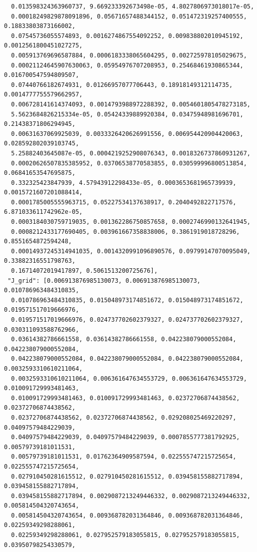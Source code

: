 \documentclass[11pt,reqno]{amsart}
\numberwithin{equation}{section}
\theoremstyle{definition}
\theoremstyle{remark}
\begin{document}
\begin{lstlisting}
  0.013598324363960737, 9.669233392673498e-05, 4.8027806973018017e-05,
  0.00018249829878091896, 0.05671657488344152, 0.051472319257400555, 0.18833803873166002,
  0.07545736055574893, 0.0016274867554092252, 0.009838802010945192, 0.0012561800451027275,
  0.005913769696587884, 0.0006183338065604295, 0.002725978105029675,
  0.00021124645907630063, 0.05954976707208953, 0.25468461930865344, 0.016700547594809507,
  0.07440766182674931, 0.01266957077706443, 0.18918149312114735, 0.0014777755579662957,
  0.006728141614374093, 0.0014793988972288392, 0.0054601805478273185,
  5.5623684826215334e-05, 0.05424339889920384, 0.03475948981696701, 0.21438371806294945,
  0.00631637069925039, 0.0033326420626991556, 0.006954420904420063, 0.028592802039103745,
  5.25882403645087e-05, 0.0004219252908076343, 0.0018326737860931267,
  0.00020626507835385952, 0.03706538770583855, 0.030599996800513854, 0.06841653547695875,
  0.332325423847939, 4.57943912298433e-05, 0.0003653681965739939, 0.0015721607201088414,
  0.0001785005555963715, 0.05227534137638917, 0.2040492822717576, 6.871033611742962e-05,
  0.0003184030759719035, 0.001362286750857658, 0.0002746990132641945,
  0.0008212433177690405, 0.003961667358838006, 0.3861919018728296, 0.8551654872594248,
  0.00014937245314941035, 0.0014320991096890576, 0.09799147070095049, 0.33882316551798763,
  0.16714072019417897, 0.5061513200725676],
 "J_grid": [0.006913876985130073, 0.006913876985130073, 0.010786963484310835,
  0.010786963484310835, 0.015048973174851672, 0.015048973174851672, 0.019571517019666976,
  0.019571517019666976, 0.024737702602379327, 0.024737702602379327, 0.030311093588762966,
  0.03614382786661558, 0.03614382786661558, 0.042238079000552084, 0.042238079000552084,
  0.042238079000552084, 0.042238079000552084, 0.042238079000552084, 0.0032593310610211064,
  0.0032593310610211064, 0.006361647634553729, 0.006361647634553729, 0.010091729993481463,
  0.010091729993481463, 0.010091729993481463, 0.02372706874438562, 0.02372706874438562,
  0.02372706874438562, 0.02372706874438562, 0.029208025469220297, 0.04097579484229039,
  0.04097579484229039, 0.04097579484229039, 0.0007855777381792925, 0.00579739181011531,
  0.00579739181011531, 0.01762364909587594, 0.022555747215725654, 0.022555747215725654,
  0.027910450281615512, 0.027910450281615512, 0.039458155882717894, 0.039458155882717894,
  0.039458155882717894, 0.0029087213249446332, 0.0029087213249446332, 0.005814504320743654,
  0.005814504320743654, 0.009368782031364846, 0.009368782031364846, 0.02259349298288061,
  0.02259349298288061, 0.027952579183055815, 0.027952579183055815, 0.03950798254330579,

\end{lstlisting}
\end{document}
